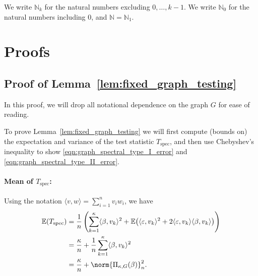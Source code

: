\documentclass{article}
\newcommand{\1}{\mathbf{1}}
\newcommand{\Ebb}{\mathbb{E}}
\newcommand{\dotp}[2]{\langle #1, #2 \rangle}
\newcommand{\spec}{\mathrm{spec}}
\theoremstyle{alden}
\theoremstyle{aldenthm}
\theoremstyle{definition}
\theoremstyle{remark}
\begin{document}
We write $\mathbb{N}_k$ for the natural numbers excluding $0,\ldots,k - 1$. We write $\mathbb{N}_0$ for the natural numbers including $0$, and $\mathbb{N} = \mathbb{N}_1$.


\section{Proofs}

\subsection{Proof of Lemma~\ref{lem:fixed_graph_testing}}

In this proof, we will drop all notational dependence on the graph $G$ for ease of reading. 

To prove Lemma~\ref{lem:fixed_graph_testing} we will first compute (bounds on) the expectation and variance of the test statistic $T_{\mathrm{spec}}$, and then use Chebyshev's inequality to show \eqref{eqn:graph_spectral_type_I_error} and \eqref{eqn:graph_spectral_type_II_error}.

\paragraph{Mean of $T_{\mathrm{spec}}$:} Using the notation $\dotp{v}{w} = \sum_{i = 1}^{n} v_iw_i$, we have
\begin{align*}
\Ebb(T_{\spec}) & = \frac{1}{n}\left(\sum_{k = 1}^{\kappa} \dotp{\beta}{v_k}^2 + \Ebb\bigl( \dotp{\varepsilon}{v_k}^2 + 2 \dotp{\varepsilon}{v_k} \dotp{\beta}{v_k}\bigr)\right) \\
& = \frac{\kappa}{n} + \frac{1}{n}\sum_{k = 1}^{\kappa}\dotp{\beta}{v_k}^2 \\
& = \frac{\kappa}{n} + \norm{\Pi_{\kappa,G}(\beta)}_n^2.
\end{align*}
\end{document}
